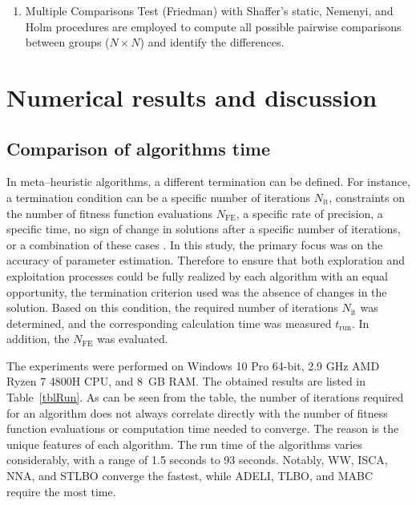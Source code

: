 \documentclass[a4paper,fleqn]{cas-dc}
\begin{document}
\begin{enumerate}[1.]
\item
Multiple Comparisons Test (Friedman) with Shaffer’s static, Nemenyi, and Holm procedures
are employed to compute all possible pairwise comparisons between groups ($N\times N$)
and identify the differences.

\end{enumerate}




\section{Numerical results and discussion}\label{Result}

\subsection{Comparison of algorithms time}
In meta--heuristic algorithms, a different termination can be defined.
For instance, a termination condition can be a specific number of iterations $N_\mathrm{it}$,
constraints on the number of fitness function evaluations $N_\mathrm{FE}$,
a specific rate of precision,
a specific time,
no sign of change in solutions after a specific number of iterations,
or a combination of these cases \cite{IntelligentChaoticClonal}.
In this study, the primary focus was on the accuracy of parameter estimation.
Therefore to ensure that both exploration and exploitation processes could be fully realized
by each algorithm with an equal opportunity, the termination criterion used was the absence of changes in the solution.
Based on this condition, the required number of iterations $N_\mathrm{it}$ was determined,
and the corresponding calculation time was measured $t_\mathrm{run}$.
In addition, the $N_\mathrm{FE}$ was evaluated.

The experiments were performed on Windows 10 Pro 64-bit,
2.9 GHz AMD Ryzen 7 4800H CPU, and 8~GB RAM.
The obtained results are listed in Table~\ref{tblRun}.
As can be seen from the table, the number of iterations required for an algorithm does not always correlate directly
with the number of fitness function evaluations or computation time needed to converge.
The reason is the unique features of each algorithm.
The run time of the algorithms varies considerably, with a range of 1.5 seconds to 93 seconds.
Notably, WW, ISCA, NNA, and STLBO converge the fastest, while ADELI, TLBO, and MABC require the most time.
\end{document}
